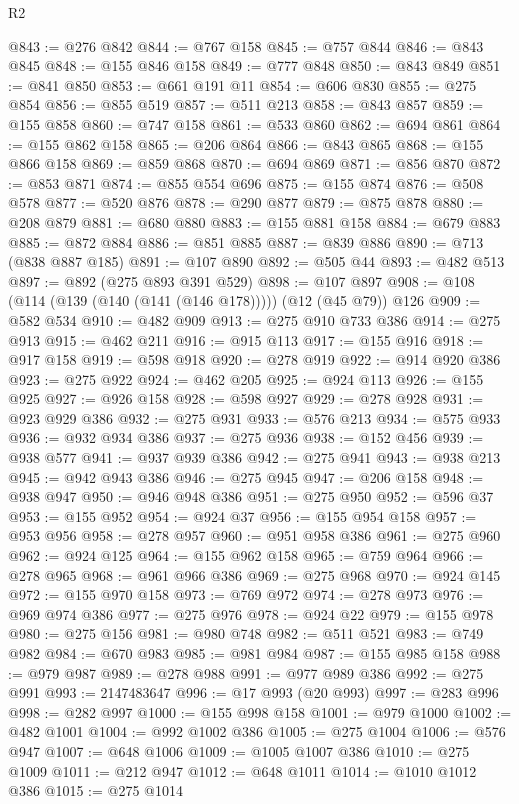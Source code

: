 \begin{lexlean}{R2}
\begin{coremodule}
@843 := @276 @842
@844 := @767 @158
@845 := @757 @844
@846 := @843 @845
@848 := @155 @846 @158
@849 := @777 @848
@850 := @843 @849
@851 := @841 @850
@853 := @661 @191 @11
@854 := @606 @830
@855 := @275 @854
@856 := @855 @519
@857 := @511 @213
@858 := @843 @857
@859 := @155 @858
@860 := @747 @158
@861 := @533 @860
@862 := @694 @861
@864 := @155 @862 @158
@865 := @206 @864
@866 := @843 @865
@868 := @155 @866 @158
@869 := @859 @868
@870 := @694 @869
@871 := @856 @870
@872 := @853 @871
@874 := @855 @554 @696
@875 := @155 @874
@876 := @508 @578
@877 := @520 @876
@878 := @290 @877
@879 := @875 @878
@880 := @208 @879
@881 := @680 @880
@883 := @155 @881 @158
@884 := @679 @883
@885 := @872 @884
@886 := @851 @885
@887 := @839 @886
@890 := @713 (@838 @887 @185)
@891 := @107 @890
@892 := @505 @44
@893 := @482 @513
@897 := @892 (@275 @893 @391 @529)
@898 := @107 @897
@908 := @108 (@114 (@139 (@140 (@141 (@146 @178))))) (@12 (@45 @79)) @126
@909 := @582 @534
@910 := @482 @909
@913 := @275 @910 @733 @386
@914 := @275 @913
@915 := @462 @211
@916 := @915 @113
@917 := @155 @916
@918 := @917 @158
@919 := @598 @918
@920 := @278 @919
@922 := @914 @920 @386
@923 := @275 @922
@924 := @462 @205
@925 := @924 @113
@926 := @155 @925
@927 := @926 @158
@928 := @598 @927
@929 := @278 @928
@931 := @923 @929 @386
@932 := @275 @931
@933 := @576 @213
@934 := @575 @933
@936 := @932 @934 @386
@937 := @275 @936
@938 := @152 @456
@939 := @938 @577
@941 := @937 @939 @386
@942 := @275 @941
@943 := @938 @213
@945 := @942 @943 @386
@946 := @275 @945
@947 := @206 @158
@948 := @938 @947
@950 := @946 @948 @386
@951 := @275 @950
@952 := @596 @37
@953 := @155 @952
@954 := @924 @37
@956 := @155 @954 @158
@957 := @953 @956
@958 := @278 @957
@960 := @951 @958 @386
@961 := @275 @960
@962 := @924 @125
@964 := @155 @962 @158
@965 := @759 @964
@966 := @278 @965
@968 := @961 @966 @386
@969 := @275 @968
@970 := @924 @145
@972 := @155 @970 @158
@973 := @769 @972
@974 := @278 @973
@976 := @969 @974 @386
@977 := @275 @976
@978 := @924 @22
@979 := @155 @978
@980 := @275 @156
@981 := @980 @748
@982 := @511 @521
@983 := @749 @982
@984 := @670 @983
@985 := @981 @984
@987 := @155 @985 @158
@988 := @979 @987
@989 := @278 @988
@991 := @977 @989 @386
@992 := @275 @991
@993 := 2147483647
@996 := @17 @993 (@20 @993)
@997 := @283 @996
@998 := @282 @997
@1000 := @155 @998 @158
@1001 := @979 @1000
@1002 := @482 @1001
@1004 := @992 @1002 @386
@1005 := @275 @1004
@1006 := @576 @947
@1007 := @648 @1006
@1009 := @1005 @1007 @386
@1010 := @275 @1009
@1011 := @212 @947
@1012 := @648 @1011
@1014 := @1010 @1012 @386
@1015 := @275 @1014

\end{coremodule}
\end{lexlean}

